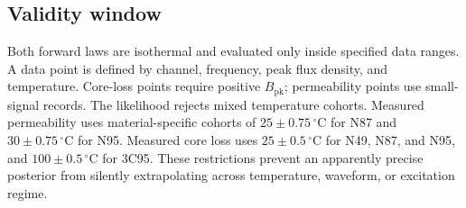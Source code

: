 \hypertarget{validity-window}{%
\subsection{Validity window}\label{validity-window}}

Both forward laws are isothermal and evaluated only inside specified
data ranges. A data point is defined by channel, frequency, peak flux
density, and temperature. Core-loss points require positive
\(B_{\mathrm{pk}}\); permeability points use small-signal records. The
likelihood rejects mixed temperature cohorts. Measured permeability uses
material-specific cohorts of \(25\pm0.75\,^{\circ}\mathrm C\) for N87
and \(30\pm0.75\,^{\circ}\mathrm C\) for N95. Measured core loss uses
\(25\pm0.5\,^{\circ}\mathrm C\) for N49, N87, and N95, and
\(100\pm0.5\,^{\circ}\mathrm C\) for 3C95. These restrictions prevent an
apparently precise posterior from silently extrapolating across
temperature, waveform, or excitation regime.

